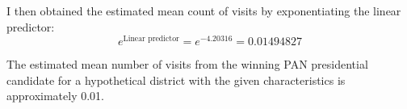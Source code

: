 \documentclass[oneside]{article}
\begin{document}
I then obtained the estimated mean count of visits by exponentiating the linear predictor:
\[e^{\text{Linear predictor}} = e^{-4.20316}
= 0.01494827
\]

The estimated mean number of visits from the winning PAN presidential candidate for a hypothetical district with the given characteristics is approximately 0.01.
\end{document}
